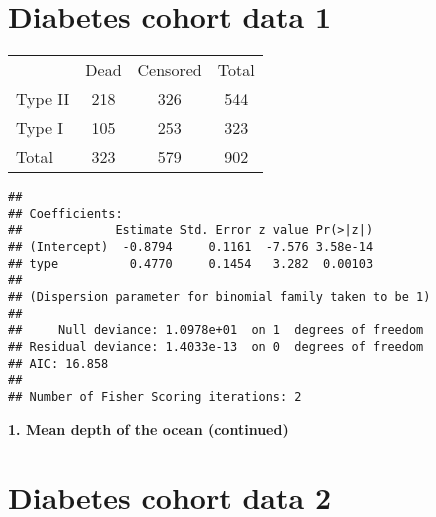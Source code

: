 \documentclass[10pt,handout]{beamer}\usepackage[]{graphicx}\usepackage[]{color}
\makeatletter
\newenvironment{kframe}{%
 \def\at@end@of@kframe{}%
 \ifinner\ifhmode%
  \def\at@end@of@kframe{\end{minipage}}%
  \begin{minipage}{\columnwidth}%
 \fi\fi%
 \def\FrameCommand##1{\hskip\@totalleftmargin \hskip-\fboxsep
 \colorbox{shadecolor}{##1}\hskip-\fboxsep
     \hskip-\linewidth \hskip-\@totalleftmargin \hskip\columnwidth}%
 \MakeFramed {\advance\hsize-\width
   \@totalleftmargin\z@ \linewidth\hsize
   \@setminipage}}%
 {\par\unskip\endMakeFramed%
 \at@end@of@kframe}
\newenvironment{knitrout}{}{} %
\makeatother
\begin{document}
\section{Diabetes cohort data 1}

\begin{frame}
	\vspace{-1.31in}
	\tiny
\begin{table}[h]
	\centering
	\begin{tabular}{lcc|c}
		& Dead &  Censored & Total\\
		Type II & 218 & 326 & 544 \\
		Type I & 105 & 253 & 323 \\
		\hline
		Total & 323 & 579 & 902
	\end{tabular}
\end{table}

	\vspace{-.21in}
\begin{knitrout}\tiny
{}\color{fgcolor}\begin{kframe}
\begin{verbatim}
## 
## Coefficients:
##             Estimate Std. Error z value Pr(>|z|)
## (Intercept)  -0.8794     0.1161  -7.576 3.58e-14
## type          0.4770     0.1454   3.282  0.00103
## 
## (Dispersion parameter for binomial family taken to be 1)
## 
##     Null deviance: 1.0978e+01  on 1  degrees of freedom
## Residual deviance: 1.4033e-13  on 0  degrees of freedom
## AIC: 16.858
## 
## Number of Fisher Scoring iterations: 2
\end{verbatim}
\end{kframe}
\end{knitrout}
\end{frame}


\begin{frame}
	\vspace*{-5.0in}
	\textbf{1. Mean depth of the ocean (continued)}
	
\end{frame}

\section{Diabetes cohort data 2}
\end{document}
